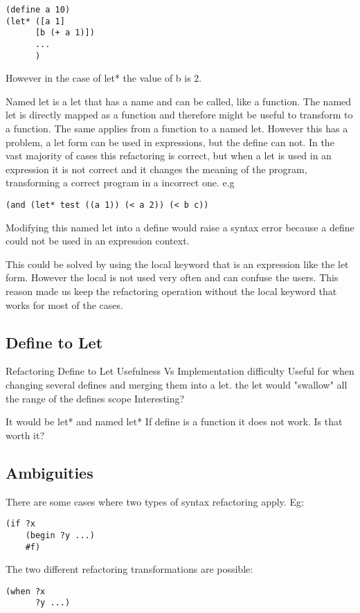 \begin{lstlisting}[basicstyle=\ttfamily, caption="Example"]
(define a 10)
(let* ([a 1]
      [b (+ a 1)])
      ...
      )
\end{lstlisting}
However in the case of let* the value of b is 2.


Named let is a let that has a name and can be called, like a function.
The named let is directly mapped as a function and therefore might be useful to transform to a function.
The same applies from a function to a named let.
However this has a problem, a let form can be used in expressions, but the define can not.
In the vast majority of cases this refactoring is correct, but when a let is used in an expression
it is not correct and it changes the meaning of the program, transforming a correct
program in a incorrect one.
e.g
\begin{lstlisting}[basicstyle=\ttfamily, caption="Example"]
(and (let* test ((a 1)) (< a 2)) (< b c))
\end{lstlisting}
Modifying this named let into a define would raise a syntax error because a
define could not be used in an expression context.

This could be solved by using the local keyword that is an expression like
the let form.
However the local is not used very often and can confuse the users. This reason
made us keep the refactoring operation without the local keyword that works for
most of the cases.


\subsection{Define to Let} %
Refactoring Define to Let Usefulness Vs Implementation difficulty
Useful for when changing several defines and merging them into a let.
the let would "swallow" all the range of the defines scope
Interesting?

It would be let* and named let* If define is a function it does not work.
Is that worth it?

\subsection{Ambiguities}
There are some cases where two types of syntax refactoring apply.
Eg:
\begin{lstlisting}[basicstyle=\ttfamily, caption="Example"]
(if ?x
    (begin ?y ...)
    #f)
\end{lstlisting}
The two different refactoring transformations are possible:
\begin{lstlisting}[basicstyle=\ttfamily, caption="Example"]
(when ?x
      ?y ...)
\end{lstlisting}

